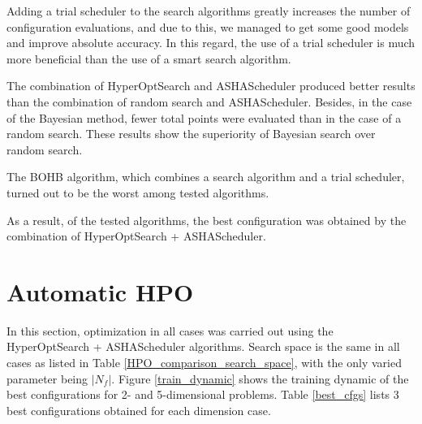 \documentclass[reprint,
superscriptaddress,
amsmath,amssymb,aps,showkeys,showpacs,
twoside,final,secnumarabic,%
nofootinbib]{revtex4-2}
\begin{document}
Adding a trial scheduler to the search algorithms greatly increases the number of configuration evaluations, and due to this, we managed to get some good models and improve absolute accuracy. In this regard, the use of a trial scheduler is much more beneficial than the use of a smart search algorithm.

The combination of HyperOptSearch and ASHAScheduler produced better results than the combination of random search and ASHAScheduler. Besides, in the case of the Bayesian method, fewer total points were evaluated than in the case of a random search. These results show the superiority of Bayesian search over random search.

The BOHB algorithm, which combines a search algorithm and a trial scheduler, turned out to be the worst among tested algorithms.

As a result, of the tested algorithms, the best configuration was obtained by the combination of HyperOptSearch + ASHAScheduler.

\section{Automatic HPO}\label{automatic_HPO}
In this section, optimization in all cases was carried out using the HyperOptSearch + ASHAScheduler algorithms. Search space is the same in all cases as listed in Table \ref{HPO_comparison_search_space}, with the only varied parameter being $|N_f|$. Figure \ref{train_dynamic} shows the training dynamic of the best configurations for 2- and 5-dimensional problems. Table \ref{best_cfgs} lists 3 best configurations obtained for each dimension case.
\end{document}
